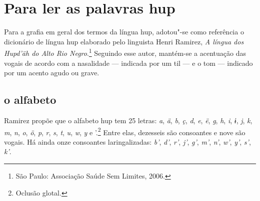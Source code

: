 \chapter{Para ler as palavras hup}

Para a grafia em geral dos termos da língua hup, adotou"-se como
referência o dicionário de língua hup elaborado pelo linguista Henri
Ramirez, \textit{A língua dos Hupd'äh do Alto Rio Negro}.\footnote{São Paulo: Associação Saúde
Sem Limites, 2006.} Seguindo esse autor, mantém-se a acentuação
das vogais de acordo com a nasalidade --- indicada por um til --- e o tom --- indicado por um acento agudo ou grave.

\section{o alfabeto}

Ramirez propõe que o alfabeto hup tem 25 letras: \textit{a}, \textit{ä}, \textit{b}, \textit{ç}, \textit{d}, \textit{e}, \textit{ë}, \textit{g},
\textit{h}, \textit{i}, \textit{ɨ}, \textit{j}, \textit{k}, \textit{m}, \textit{n}, \textit{o}, \textit{ö}, \textit{p}, \textit{r}, \textit{s}, \textit{t}, \textit{u}, \textit{w}, \textit{y} e '.\footnote{Oclusão
glotal.} Entre elas, dezesseis são consoantes e nove são vogais. Há ainda onze consoantes
laringalizadas: \textit{b'}, \textit{d'}, \textit{r'}, \textit{j'}, \textit{g'}, \textit{m'}, \textit{n'}, \textit{w'}, \textit{y'}, \textit{s'}, \textit{k'}.

